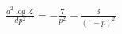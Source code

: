 \documentclass[A4,11pt]{article}
\begin{document}
\thispagestyle{empty}
$\frac{d^2 \log \mathcal{L}}{dp^2} = -\frac{7}{p^2} - \frac{3}{(1-p)^2}$
\end{document}
